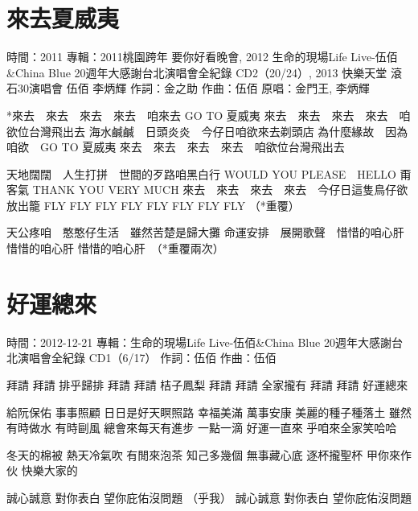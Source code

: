 \documentclass[UTF8,a4paper,oneside,twocolumn,12pt]{ctexbook}
\newcommand{\infopair}[2]{\textbullet #1：#2}
\newcommand{\zc}[1][伍佰]{\infopair{作詞}{#1}}
\newcommand{\zq}[1][伍佰]{\infopair{作曲}{#1}}
\newcommand{\zj}[1]{\infopair{專輯}{#1}}
\newcommand{\yc}[1]{\infopair{原唱}{#1}}
\newcommand{\sj}[1]{\infopair{時間}{#1}}
\newenvironment{info}{\begin{flushleft}\kaishu
	}
	{\end{flushleft}\normalsize\yahei\par}
\newenvironment{lyric}{
	}
{}
\begin{document}
\section{來去夏威夷} %
\begin{info}
	\sj{2011}
	\zj{2011桃園跨年 要你好看晚會, 2012 生命的現場Life Live-伍佰\&China Blue 20週年大感謝台北演唱會全紀錄 CD2（20/24）, 2013 快樂天堂 滾石30演唱會 伍佰 李炳輝}
	\zc[金之助] %
	\zq
	\yc{金門王, 李炳輝}
\end{info}
\begin{lyric}
	*來去　來去　來去　來去　咱來去 GO TO 夏威夷
	來去　來去　來去　來去　咱欲位台灣飛出去
	海水鹹鹹　日頭炎炎　今仔日咱欲來去剃頭店
	為什麼緣故　因為咱欲　GO TO 夏威夷
	來去　來去　來去　來去　咱欲位台灣飛出去

	天地闊闊　人生打拼　世間的歹路咱黑白行
	WOULD YOU PLEASE　HELLO 甭客氣
	THANK YOU VERY MUCH
	來去　來去　來去　來去　今仔日這隻鳥仔欲放出籠
	FLY FLY FLY FLY FLY FLY FLY FLY （*重覆）

	天公疼咱　憨憨仔生活　雖然苦楚是歸大攤
	命運安排　展開歌聲　惜惜的咱心肝　惜惜的咱心肝
	惜惜的咱心肝　（*重覆兩次）
\end{lyric}

\section{好運總來}
\begin{info}
	\sj{2012-12-21}
	\zj{生命的現場Life Live-伍佰\&China Blue 20週年大感謝台北演唱會全紀錄 CD1（6/17）}
	\zc
	\zq
\end{info}
\begin{lyric}
	拜請 拜請 排乎歸排
	拜請 拜請 桔子鳳梨
	拜請 拜請 全家攏有
	拜請 拜請 好運總來

	給阮保佑 事事照顧 日日是好天瞑照路
	幸福美滿 萬事安康 美麗的種子種落土
	雖然有時做水 有時剾風 總會來每天有進步
	一點一滴 好運一直來 乎咱來全家笑哈哈

	冬天的棉被 熱天冷氣吹 有閒來泡茶 知己多幾個
	無事藏心底 逐杯攏聖杯 甲你來作伙 快樂大家的

	誠心誠意 對你表白 望你庇佑沒問題
	（乎我）
	誠心誠意 對你表白 望你庇佑沒問題
\end{lyric}
\end{document}
